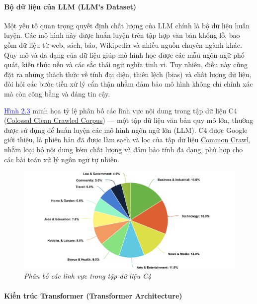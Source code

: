 \documentclass{article}
\begin{document}
\paragraph{Bộ dữ liệu của LLM (LLM's Dataset)}

Một yếu tố quan trọng quyết định chất lượng của LLM chính là bộ dữ liệu huấn luyện. Các mô hình này được huấn luyện trên tập hợp văn bản khổng lồ, bao gồm dữ liệu từ web, sách, báo, Wikipedia và nhiều nguồn chuyên ngành khác. Quy mô và đa dạng của dữ liệu giúp mô hình học được các mẫu ngôn ngữ phổ quát, kiến thức nền và các sắc thái ngữ nghĩa tinh vi. Tuy nhiên, điều này cũng đặt ra những thách thức về tính đại diện, thiên lệch (bias) và chất lượng dữ liệu, đòi hỏi các bước tiền xử lý cẩn thận nhằm đảm bảo mô hình không chỉ chính xác mà còn công bằng và đáng tin cậy.

\hyperref[fig:distribution-data-in-c4-dataset]{\textcolor{blue}{Hình 2.3}} minh họa tỷ lệ phân bố các lĩnh vực nội dung trong tập dữ liệu C4 (\href{https://arxiv.org/abs/1910.10683}{Colossal Clean Crawled Corpus}) — một tập dữ liệu văn bản quy mô lớn, thường được sử dụng để huấn luyện các mô hình ngôn ngữ lớn (LLM). C4 được Google giới thiệu, là phiên bản đã được làm sạch và lọc của tập dữ liệu \href{https://commoncrawl.org/}{Common Crawl}, nhằm loại bỏ nội dung kém chất lượng và đảm bảo tính đa dạng, phù hợp cho các bài toán xử lý ngôn ngữ tự nhiên.

\begin{figure}[H]
    \centering
    \includegraphics[width=1\linewidth]{img/distribution-data-in-c4-dataset.png}
    \caption{\centering\textit{Phân bố các lĩnh vực trong tập dữ liệu C4}}
    \label{fig:distribution-data-in-c4-dataset}
\end{figure}

\paragraph{Kiến trúc Transformer (Transformer Architecture)}
\end{document}
